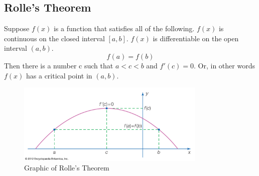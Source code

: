 \documentclass{article}
\newcommand{\comment}[1]{}
\begin{document}
    \comment{
    \section*{Rolle's Thorem}
    Let $f$ be a continuous function on $[a, b]$ and differentiable on $]a, b[$ such that $f(a) = f(b)$. Then there exists $c \in ]a, b[ $ such that $f'(c) = 0$.

    This theorem will be admitted because its proof requires results which are not seen in this course. If $f$ is the constant function, the result is obvious. Otherwise, since $f$ is continuous over $[a, b]$, $f$ is bounded over $[a, b]$
    and reaches its bounds. This means that there exists $m \in  [a, b] $ and $M \in  [a, b] $ such that $\forall x \in  [a, b]$, $f(m) \leqslant  f(x) \leqslant f(M) (f(m) \neq  f(M)$ because $f$ is not a constant function$)$. As $f(a) = f(b)$, then we have the following cases:

    \begin{enumerate}
        \item if $m = a$ or $m = b$, then $M \in  ]a, b[$, hence we have $c = M$;
        \item if $M = a$ or $M = b$, then $m \in  ]a, b[$, hence we have $c = m$;
        \item $m \in  ]a, b[$ and $M \in  ]a, b[$, hence we have $c = m$ or $c = M$.
    \end{enumerate}

    So in all cases $f$ admits a local extremum at a point $c$ of $]a, b[$ and is differentiable on $]a, b[$, hence, according to the proposition 22, $f'(c) = 0$.
    \section*{Hint}
    Use $g : x \rightarrow  e^ {\alpha x} $
    }

    \subsection{Rolle's Theorem}
    Suppose $f(x)$ is a function that satisfies all of the following.
    $f(x)$ is continuous on the closed interval $[a,b]$.
    $f(x)$ is differentiable on the open interval $(a,b)$.
    $$f(a) = f(b)$$
    Then there is a number c such that $a<c<b$ and $f'(c)=0$. Or, in other words $f(x)$ has a critical point in $(a,b)$.

    \begin{figure}[H]
        \centering
        \includegraphics[width=340px]{img/rollestheorem.jpg}
        \caption{Graphic of Rolle's Theorem}
    \end{figure}
\end{document}
